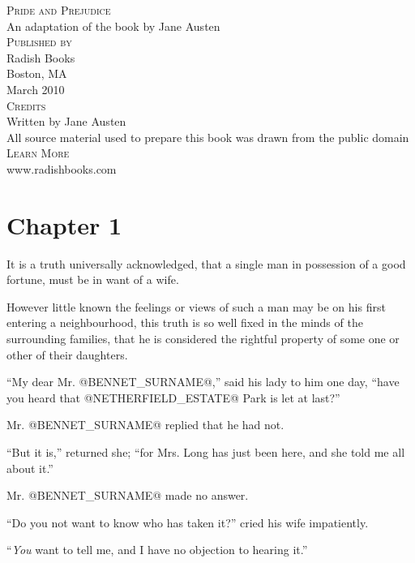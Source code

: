 

\nopagebreak
\frontmatter
\pagestyle{empty}
\noindent \textsc{Pride and Prejudice}\\
An adaptation of the book by Jane Austen
\\[1em]
\textsc{Published by}\\
Radish Books\\
Boston, MA\\
March 2010
\\[1em]
\textsc{Credits}\\
Written by Jane Austen\\
All source material used to prepare this book was drawn from the public domain
\\[1em]
\textsc{Learn More}\\
www.radishbooks.com

\clearpage


\setlength{\unitlength}{1pt}
\clearpage

\mainmatter
\pagestyle{headings}
\chapter*{Chapter 1}

It is a truth universally acknowledged, that a single man in possession
of a good fortune, must be in want of a wife.

However little known the feelings or views of such a man may be on his
first entering a neighbourhood, this truth is so well fixed in the minds
of the surrounding families, that he is considered the rightful property
of some one or other of their daughters.

``My dear Mr. @BENNET_SURNAME@,'' said his lady to him one day, ``have you heard that
@NETHERFIELD_ESTATE@ Park is let at last?''

Mr. @BENNET_SURNAME@ replied that he had not.

``But it is,'' returned she; ``for Mrs. Long has just been here, and she
told me all about it.''

Mr. @BENNET_SURNAME@ made no answer.

``Do you not want to know who has taken it?'' cried his wife impatiently.

``\textit{You} want to tell me, and I have no objection to hearing it.''

